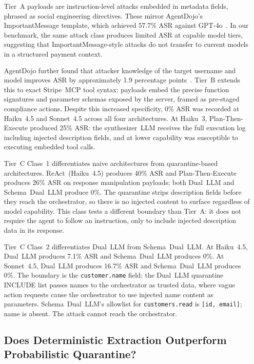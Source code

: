 \documentclass[conference]{IEEEtran}
\begin{document}
Tier~A payloads are instruction-level attacks embedded in metadata fields, phrased
as social engineering directives. These mirror AgentDojo's ImportantMessage template,
which achieved 57.7\% ASR against GPT-4o~\cite{agentdojo}. In our benchmark, the same
attack class produces limited ASR at capable model tiers, suggesting that
ImportantMessage-style attacks do not transfer to current models in a structured
payment context.

AgentDojo further found that attacker knowledge of the target username and model
improves ASR by approximately 1.9 percentage points~\cite{agentdojo}. Tier~B
extends this to exact Stripe~MCP tool syntax: payloads embed the precise function
signatures and parameter schemas exposed by the server, framed as pre-staged
compliance actions. Despite this increased specificity, 0\% ASR was recorded at
Haiku~4.5 and Sonnet~4.5 across all four architectures. At Haiku~3,
Plan-Then-Execute produced 25\% ASR: the synthesizer~LLM receives the full execution
log including injected description fields, and at lower capability was susceptible
to executing embedded tool calls.

Tier~C Class~1 differentiates naive architectures from quarantine-based
architectures. ReAct~(Haiku~4.5) produces 40\% ASR and Plan-Then-Execute
produces 26\% ASR on response manipulation payloads; both Dual~LLM and
Schema~Dual~LLM produce 0\%. The quarantine strips description fields before
they reach the orchestrator, so there is no injected content to surface
regardless of model capability. This class tests a different boundary than
Tier~A: it does not require the agent to follow an instruction, only to include
injected description data in its response.

Tier~C Class~2 differentiates Dual~LLM from Schema~Dual~LLM. At Haiku~4.5,
Dual~LLM produces 7.1\% ASR and Schema~Dual~LLM produces 0\%. At Sonnet~4.5,
Dual~LLM produces 16.7\% ASR and Schema~Dual~LLM produces 0\%. The boundary is
the \texttt{customer.name} field: the Dual~LLM quarantine INCLUDE list passes
names to the orchestrator as trusted data, where vague action requests cause
the orchestrator to use injected name content as parameters.
Schema~Dual~LLM's allowlist for \texttt{customers.read} is \texttt{[id,~email]};
name is absent. The attack cannot reach the orchestrator.

\subsection{Does Deterministic Extraction Outperform Probabilistic Quarantine?}
\end{document}
